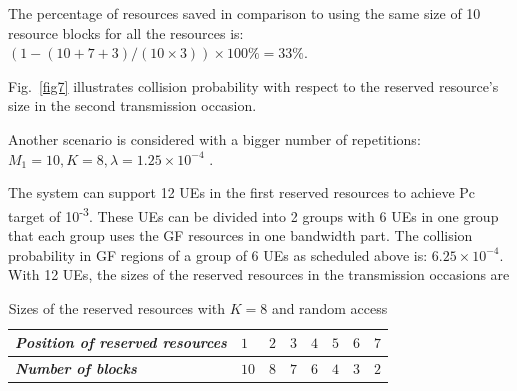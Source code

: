 \documentclass[conference]{IEEEtran}
\begin{document}

The percentage of resources saved in comparison to using the same size of 10 resource blocks for all the resources is: $(1 - (10+7+3)/(10\times3))\times100\% = 33\%$.

Fig.~\ref{fig7} illustrates collision probability with respect to the reserved resource's size in the second transmission occasion.

Another scenario is considered with a bigger number of repetitions: $M_1=10, K=8, \lambda=1.25\times10^{-4}$ .

The system can support 12 UEs in the first reserved resources to achieve Pc target of 10\textsuperscript{-3}. These UEs can be divided into 2 groups with 6 UEs in one group that each group uses the GF resources in one bandwidth part. The collision probability in GF regions of a group of 6 UEs as scheduled above is: $6.25\times10^{-4}$.
With 12 UEs, the sizes of the reserved resources in the transmission occasions are

\begin{table}[htbp]
\caption{Sizes of the reserved resources with $K=8$ and random access}
\begin{center}
\begin{tabular}{|p{5em}|p{2em}|p{2em}|p{2em}|p{2em}|p{2em}|p{2em}|p{2em}|}
 \hline
 \textbf{\textit{Position of reserved resources}} & $1$ &$2$ &$3$ & $4$ &$5$ &$6$ &$7$\\ 
 \hline
 \textbf{\textit{Number of blocks}} & $10$ &$8$ &$7$ & $6$ &$4$ &$3$ &$2$\\

 
 \hline
\end{tabular}
\label{tab2}
\end{center}
\end{table}
\end{document}
